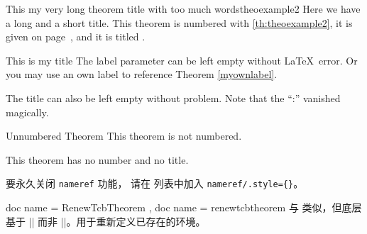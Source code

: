 \begin{docCommands}[
    doc parameter = \oarg{init options}\marg{name}\marg{display name}\marg{options}\marg{prefix},
    doc updated=2022-07-18
    ]
\begin{dispExample}
\begin{mytheo}{This my very long theorem title with
    too much words}{theoexample2}
  Here we have a long and a short title. This theorem is numbered with
  \ref{th:theoexample2}, it is given on page~\pageref{th:theoexample2},
  and it is titled \flqq{}\frqq.
\end{mytheo}
\end{dispExample}

\begin{dispExample}
\begin{mytheo}[label=myownlabel]{This is my title}{}
  The label parameter can be left empty without \LaTeX\ error.
  Or you may use an own label to reference Theorem \ref{myownlabel}.
\end{mytheo}
\end{dispExample}

\begin{dispExample}
\begin{mytheo}{}{}
  The title can also be left empty without problem. Note that the \enquote{:}
  vanished magically.
\end{mytheo}
\end{dispExample}

\begin{dispExample}
\begin{mytheo*}{Unnumbered Theorem}
  This theorem is not numbered.
\end{mytheo*}
\end{dispExample}

\begin{dispExample}
\begin{mytheo*}{}
  This theorem has no number and no title.
\end{mytheo*}
\end{dispExample}

\begin{marker}
要永久关闭 \texttt{nameref} 功能，
请在  列表中加入
\mbox{\texttt{nameref/.style=\{\}}}。
\end{marker}

\end{docCommands}

\medskip

\begin{docCommands}[
    doc parameter = \oarg{init options}\marg{name}\marg{display name}\marg{options}\marg{prefix},
    doc updated=2022-07-18
    ]
    {
      { doc name = RenewTcbTheorem },
      { doc name = renewtcbtheorem }
    }
  与  类似，但底层基于 |\RenewDocumentEnvironment|
  而非 |\NewDocumentEnvironment|。用于重新定义已存在的环境。
\end{docCommands}


